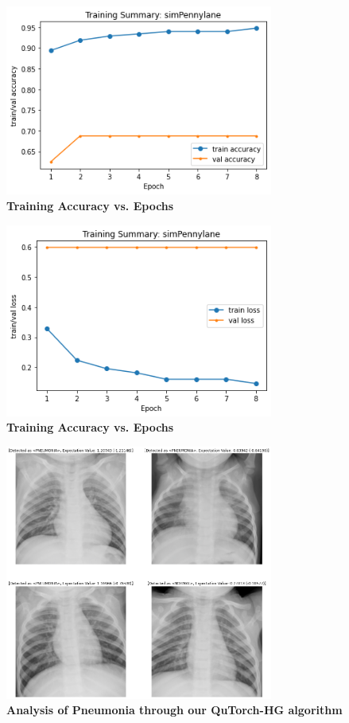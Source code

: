 \documentclass{scrartcl}
\begin{document}
\begin{figure}[htbp]
\centering
\includegraphics[width=250pt]{./assets/output1.png}
\caption{\textbf{Training Accuracy vs. Epochs}}
\end{figure}
\begin{figure}[htbp]
\centering
\includegraphics[width=250pt]{./assets/output2.png}
\caption{\textbf{Training Accuracy vs. Epochs}}
\end{figure}

\begin{figure}[htbp]
\centering
\includegraphics[width=250pt]{./assets/output3.png}
\caption{\textbf{Analysis of Pneumonia through our QuTorch-HG algorithm}}
\end{figure}
\end{document}
